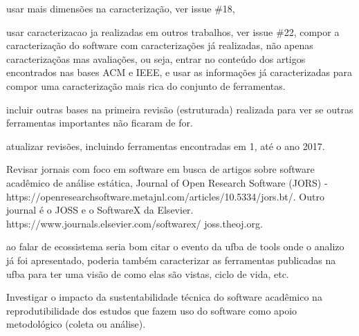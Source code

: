 usar mais dimensões na caracterização, ver issue \#18, 

usar caracterizacao ja realizadas em outros trabalhos, ver issue \#22,
compor a caracterização do software com caracterizações já realizadas,
não apenas caracterizaçõas mas avaliações, ou seja, entrar no conteúdo
dos artigos encontrados nas bases ACM e IEEE, e usar as informações
já caracterizadas para compor uma caracterização mais rica
do conjunto de ferramentas.

incluir outras bases na primeira revisão (estruturada) realizada para
ver se outras ferramentas importantes não ficaram de for.

atualizar revisões, incluindo ferramentas encontradas em 1, até o ano 2017. 

Revisar jornais com foco em software em busca de artigos sobre
software acadêmico de análise estática, 
Journal of Open Research Software (JORS) -
 https://openresearchsoftware.metajnl.com/articles/10.5334/jors.bt/.
Outro journal é o JOSS e o SoftwareX da Elsevier. https://www.journals.elsevier.com/softwarex/ joss.theoj.org.

ao falar de ecossistema seria bom citar o evento da ufba de tools onde o
analizo já foi apresentado, poderia também caracterizar as ferramentas
publicadas na ufba para ter uma visão de como elas são vistas, ciclo de vida,
etc.

Investigar o impacto da sustentabilidade técnica do software acadêmico na
reprodutibilidade dos estudos que fazem uso do software como apoio metodológico
(coleta ou análise).




